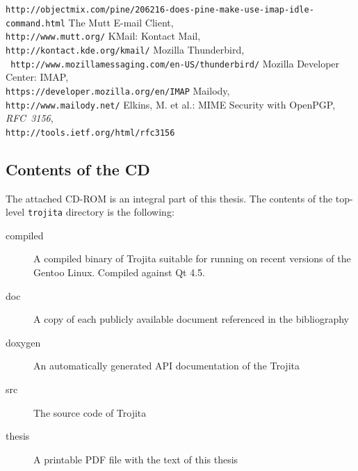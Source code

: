\documentclass[12pt,notitlepage]{report}
\newcommand{\trojita}{Trojita\xspace}
\begin{document}
\begin{thebibliography}{99}
        {\tt http://objectmix.com/pine/206216-does-pine-make-use-imap-idle-command.html}
    The Mutt E-mail Client, \\
        {\tt http://www.mutt.org/}
    KMail: Kontact Mail, \\{\tt http://kontact.kde.org/kmail/}
    Mozilla Thunderbird, \\{\tt
        http://www.mozillamessaging.com/en-US/thunderbird/}
    Mozilla Developer Center: IMAP, \\
        {\tt https://developer.mozilla.org/en/IMAP}
    Mailody, \\{\tt http://www.mailody.net/}
    Elkins, M. et al.: MIME Security with OpenPGP,
        {\em RFC~3156}, \\
        {\tt http://tools.ietf.org/html/rfc3156}
\end{thebibliography}

\begin{appendix}
\chapter{Contents of the CD}

The attached CD-ROM is an integral part of this thesis.  The contents of the
top-level {\tt trojita} directory is the following:

\begin{description}
    \item[compiled] A compiled binary of \trojita suitable for running on recent
        versions of the Gentoo Linux.  Compiled against Qt 4.5.
    \item[doc] A copy of each publicly available document referenced in the
        bibliography
    \item[doxygen] An automatically generated API documentation of the \trojita
    \item[src] The source code of \trojita
    \item[thesis] A printable PDF file with the text of this thesis
\end{description}


\end{appendix}
\end{document}

